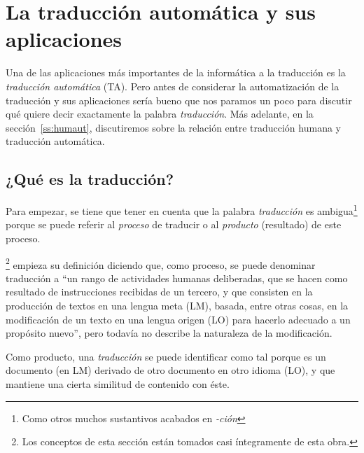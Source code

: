 \chapter[Traducción automática y aplicaciones]{La traducción automática y sus aplicaciones} \label{se:UTA} \label{se:TiTA} 

Una de las aplicaciones más importantes de la informática a la traducción es la \emph{traducción automática} (TA). Pero antes de considerar la automatización de la traducción y sus aplicaciones sería bueno que nos paramos un poco para discutir qué quiere decir exactamente la palabra \emph{traducción}. Más adelante, en la sección~\ref{ss:humaut}, discutiremos sobre la relación entre traducción humana y traducción automática. 

\section{¿Qué es la traducción?} \label{ss:trad} 

Para empezar, se tiene que tener en cuenta que la palabra \emph{traducción} es ambigua\footnote{Como otros muchos sustantivos acabados en \emph{-ción}} porque se puede referir al \emph{proceso} de traducir o al \emph{producto} (resultado) de este proceso. 

\citet{sager93b}\footnote{Los conceptos de esta sección están tomados casi íntegramente de esta obra.} empieza su definición diciendo que, como proceso, se puede denominar traducción a ``un rango de actividades humanas deliberadas, que se hacen como resultado de instrucciones recibidas de un tercero, y que consisten en la producción de textos en una lengua meta (LM), basada, entre otras cosas, en la modificación de un texto en una lengua origen (LO) para hacerlo adecuado a un propósito nuevo'', pero todavía no describe la naturaleza de la modificación. 

Como producto, una \emph{traducción} se puede identificar como tal porque es un documento (en LM) derivado de otro documento en otro idioma (LO), y que mantiene una cierta similitud de contenido con éste. 

